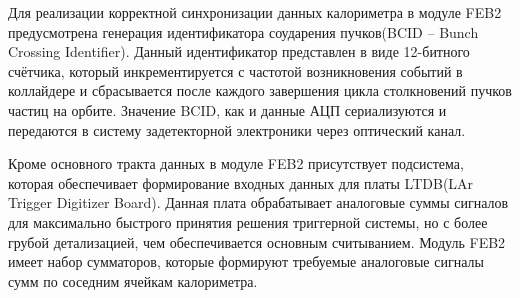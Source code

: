 Для реализации корректной синхронизации данных калориметра в модуле FEB2 предусмотрена генерация идентификатора соударения пучков(BCID -- Bunch Crossing Identifier). Данный идентификатор представлен в виде 12-битного счётчика, который инкрементируется с частотой возникновения событий в коллайдере и сбрасывается после каждого завершения цикла столкновений пучков частиц на орбите. Значение BCID, как и данные АЦП сериализуются и передаются в систему задетекторной электроники через оптический канал.\par
Кроме основного тракта данных в модуле FEB2 присутствует подсистема, которая обеспечивает формирование входных данных для платы LTDB(LAr Trigger Digitizer Board). Данная плата обрабатывает аналоговые суммы сигналов для максимально быстрого принятия решения триггерной системы, но с более грубой детализацией, чем обеспечивается основным считыванием. Модуль FEB2 имеет набор сумматоров, которые формируют требуемые аналоговые сигналы сумм по соседним ячейкам калориметра.\par
